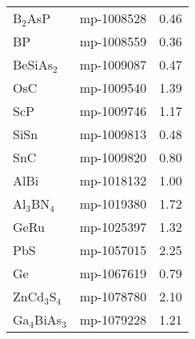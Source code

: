 \begin{center}
\begin{longtable}{M{3.5cm} M{6.5cm} M{2.0cm}}
  B$_2$AsP & mp-1008528 & 0.46\\
  BP & mp-1008559 & 0.36\\
  BeSiAs$_2$ & mp-1009087 & 0.47\\
  OsC & mp-1009540 & 1.39\\
  ScP & mp-1009746 & 1.17\\
  SiSn & mp-1009813 & 0.48\\
  SnC & mp-1009820 & 0.80\\
  AlBi & mp-1018132 & 1.00\\
  Al$_3$BN$_4$ & mp-1019380 & 1.72\\
  GeRu & mp-1025397 & 1.32\\
  PbS & mp-1057015 & 2.25\\
  Ge & mp-1067619 & 0.79\\
  ZnCd$_3$S$_4$ & mp-1078780 & 2.10\\
  Ga$_4$BiAs$_3$ & mp-1079228 & 1.21\\
  \hline
\end{longtable}
\end{center}

